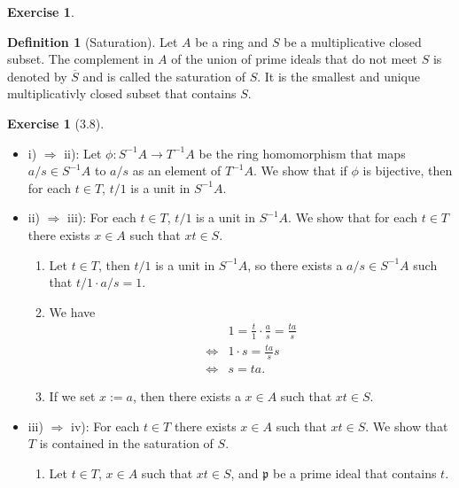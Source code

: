 \documentclass{book}
\theoremstyle{plain}
\theoremstyle{definition}
\newtheorem{exercise}[theorem]{Exercise}
\theoremstyle{custom_definition}
\newtheorem{definition}[theorem]{Definition}
\begin{document}
\begin{exercise}
    
\end{exercise}

\begin{definition}[Saturation]
    Let \(A\) be a ring and \(S\) be a multiplicative closed subset. The complement in \(A\) of the union of prime ideals that do not meet \(S\) is denoted by \(\overline{S}\) and is called the saturation of \(S\). It is the smallest and unique multiplicativly closed subset that contains \(S\).
\end{definition}

\begin{exercise}[3.8]
    \begin{itemize}
        \item i) \(\Rightarrow\) ii): Let \(\phi: S^{-1}A \longrightarrow T^{-1}A\) be the ring homomorphism that maps \(a/s \in S^{-1}A\) to \(a/s\) as an element of \(T^{-1}A\). We show that if \(\phi\) is bijective, then for each \(t \in T\), \(t/1\) is a unit in \(S^{-1}A\).
        \item ii) \(\Rightarrow\) iii): For each \(t \in T\), \(t/1\) is a unit in \(S^{-1}A\). We show that for each \(t \in T\) there exists \(x \in A\) such that \(xt \in S\).
        \begin{enumerate}
            \item Let \(t \in T\), then \(t/1\) is a unit in \(S^{-1}A\), so there exists a \(a/s \in S^{-1}A\) such that \(t/1 \cdot a/s = 1\).
            \item We have
            \begin{align}
                & 1 = \frac{t}{1} \cdot \frac{a}{s} = \frac{t a}{s} \\
                \iff & 1 \cdot s = \frac{t a}{s} s \\
                \iff & s = t a \text{.}
            \end{align}
            \item If we set \(x := a\), then there exists a \(x \in A\) such that \(xt \in S\).
        \end{enumerate}
        \item iii) \(\Rightarrow\) iv): For each \(t \in T\) there exists \(x \in A\) such that \(xt \in S\). We show that \(T\) is contained in the saturation of \(S\).
        \begin{enumerate}
            \item Let \(t \in T\), \(x \in A\) such that \(xt \in S\), and \(\mathfrak{p}\) be a prime ideal that contains \(t\).

\end{enumerate}
\end{itemize}
\end{exercise}
\end{document}
